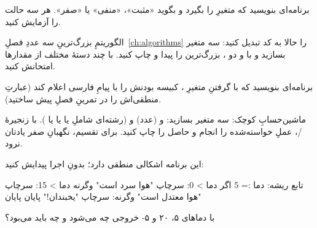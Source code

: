 \exercise برنامه‌ای بنویسید که متغیرِ  را بگیرد و بگوید «مثبت»،
«منفی» یا «صفر». هر سه حالت را آزمایش کنید.

\exercise الگوریتمِ بزرگ‌ترینِ سه عددِ فصلِ~\ref{ch:algorithms} را حالا به
کد تبدیل کنید: سه متغیر بسازید و با  و دو ،
بزرگ‌ترین را پیدا و چاپ کنید. با چند دستهٔ مختلف از مقدارها امتحانش کنید.

\exercise برنامه‌ای بنویسید که با گرفتنِ متغیرِ ، کبیسه بودنش را
با پیامِ فارسی اعلام کند (عبارتِ منطقی‌اش را در تمرینِ فصلِ پیش ساختید).

\exercise ماشین‌حسابِ کوچک: سه متغیر بسازید:  و  (عدد) و
 (رشته‌ای شاملِ  یا  یا  یا
). با زنجیرهٔ /، عملِ خواسته‌شده را انجام و
حاصل را چاپ کنید. برای تقسیم، نگهبانِ صفر یادتان نرود.

\exercise این برنامه اشکالی منطقی دارد؛ بدونِ اجرا پیدایش کنید:
\begin{salamfa}
تابع ریشه:
    دما := 5
    اگر دما > 0:
        سرچاپ "هوا سرد است"
    وگرنه دما > 15:
        سرچاپ "هوا معتدل است"
    وگرنه:
        سرچاپ "یخبندان!"
    پایان
پایان
\end{salamfa}
با دماهای ۵، ۲۰ و ۵- خروجی چه می‌شود و چه باید می‌بود؟
